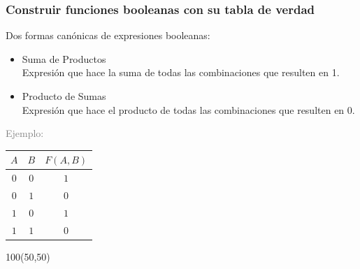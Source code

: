 \documentclass[aspectratio=169]{beamer}
\begin{document}
\begin{frame}[fragile,t]
    \frametitle{Construir funciones booleanas con su tabla de verdad}
    Dos formas canónicas de expresiones booleanas:
    \pause
    \begin{itemize}
    \item \textcolor{naranjauca}{Suma de Productos}\\
    \small Expresión que hace la suma de todas las combinaciones que resulten en 1.
    \pause
    \item \textcolor{naranjauca}{Producto de Sumas}\\
    \small Expresión que hace el producto de todas las combinaciones que resulten en 0.
    \pause
    \end{itemize}
    \bigskip
    \textcolor{gray}{Ejemplo:}\\
    \bigskip
    \begin{tabular}{|c|c|c|}
    \hline
    $A$ & $B$ & $F(A,B)$ \\
    \hline
    $0$ & $0$ & \textcolor{azul}{$1$} \\
    $0$ & $1$ & \textcolor{verde}{$0$} \\
    $1$ & $0$ & \textcolor{rojo}{$1$} \\
    $1$ & $1$ & \textcolor{amarillo}{$0$} \\
    \hline
    \end{tabular}
    \begin{textblock}{100}(50,50)
    \bigskip    
    \end{textblock}
\end{frame}
\end{document}
